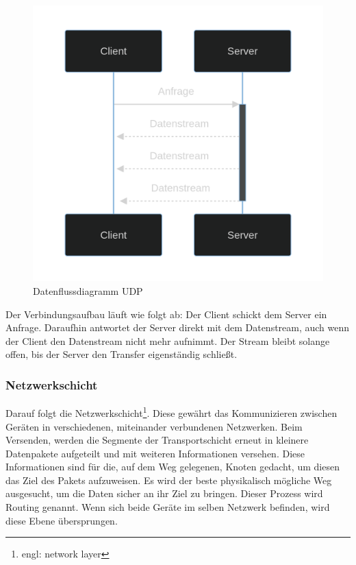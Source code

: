 \documentclass[12pt]{article}
\begin{document}
\begin{figure}
	\centering
	\includegraphics[scale=0.15]{Bilder/Datenfluss_UDP}
	\caption{Datenflussdiagramm UDP\cite{datenflussdiagramm-udp}}
	\label{fig:figure7}
\end{figure}

Der Verbindungsaufbau läuft wie folgt ab: Der Client schickt dem Server ein Anfrage. Daraufhin antwortet der Server direkt mit dem Datenstream, auch wenn der Client den Datenstream nicht mehr aufnimmt. Der Stream bleibt solange offen, bis der Server den Transfer eigenständig schließt.


\subsubsection{Netzwerkschicht}
	Darauf folgt die Netzwerkschicht\footnote{engl: network layer}. Diese gewährt das Kommunizieren zwischen Geräten in verschiedenen, miteinander verbundenen Netzwerken. Beim Versenden, werden die Segmente der Transportschicht erneut in kleinere Datenpakete aufgeteilt und mit weiteren Informationen versehen. Diese Informationen sind für die, auf dem Weg gelegenen, Knoten gedacht, um diesen das Ziel des Pakets aufzuweisen. Es wird der beste physikalisch mögliche Weg ausgesucht, um die Daten sicher an ihr Ziel zu bringen. Dieser Prozess wird Routing genannt.\cite{routing}
	Wenn sich beide Geräte im selben Netzwerk befinden, wird diese Ebene übersprungen. 
	
\end{document}
